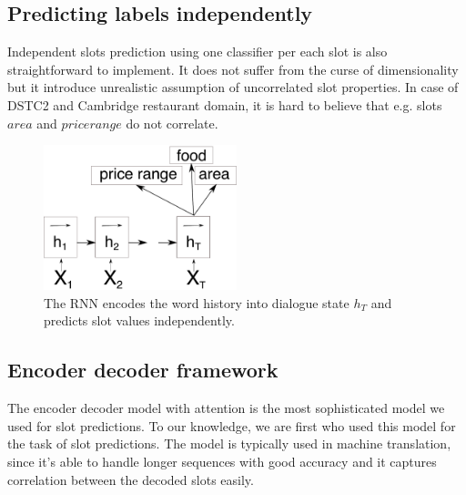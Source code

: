 \documentclass{itatnew}
\def\VH#1{\textcolor{cyan}{VH: \textit{#1}}}
\def\PB#1{\textcolor{red}{PB: \textit{#1}}}
\begin{document}
\subsection{Predicting labels independently}
\label{sec:indep}
Independent slots prediction using one classifier per each slot is also straightforward to implement.
It does not suffer from the curse of dimensionality but it introduce unrealistic assumption of uncorrelated slot properties.
In case of DSTC2 and Cambridge restaurant domain, it is hard to believe that e.g. slots $area$ and $price range$ do not correlate.
\begin{figure}
\includegraphics[width=0.5\textwidth]{encoder}
\caption{The RNN encodes the word history into dialogue state $h_T$ and predicts slot values independently.}
\label{fig:encind}
\end{figure}

\subsection{Encoder decoder framework}
\label{sec:encdec}
The encoder decoder model with attention\cite{bahdanau2014neural} is the most sophisticated model we used for slot predictions.
To our knowledge, we are first who used this model for the task of slot predictions.
The model is typically used in machine translation, since it's  able to handle longer sequences with good accuracy and it captures correlation between the decoded slots easily\cite{bahdanau2014neural}. %
\end{document}
